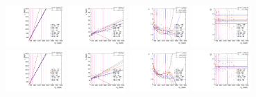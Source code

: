 \begin{figure}[htbp]
  \centering
  \includegraphics[width=0.2\textwidth]{fig/analysisAppendix/paramSignalShape_allSig_MVV_HP_bb_LDy_MEAN.pdf}
  \includegraphics[width=0.2\textwidth]{fig/analysisAppendix/paramSignalShape_allSig_MVV_HP_bb_LDy_SIGMA.pdf}
  \includegraphics[width=0.2\textwidth]{fig/analysisAppendix/paramSignalShape_allSig_MVV_HP_bb_LDy_ALPHA1.pdf}
  \includegraphics[width=0.2\textwidth]{fig/analysisAppendix/paramSignalShape_allSig_MVV_HP_bb_LDy_ALPHA2.pdf}\\
  \includegraphics[width=0.2\textwidth]{fig/analysisAppendix/paramSignalShape_allSig_MVV_LP_bb_LDy_MEAN.pdf}
  \includegraphics[width=0.2\textwidth]{fig/analysisAppendix/paramSignalShape_allSig_MVV_LP_bb_LDy_SIGMA.pdf}
  \includegraphics[width=0.2\textwidth]{fig/analysisAppendix/paramSignalShape_allSig_MVV_LP_bb_LDy_ALPHA1.pdf}
  \includegraphics[width=0.2\textwidth]{fig/analysisAppendix/paramSignalShape_allSig_MVV_LP_bb_LDy_ALPHA2.pdf}\\

\end{figure}
